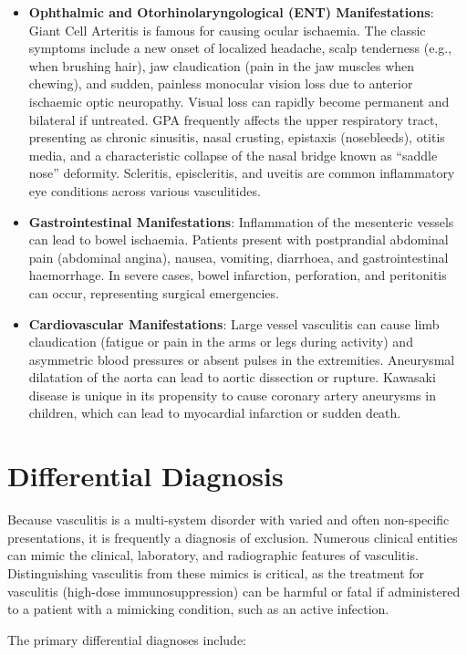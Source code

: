\begin{itemize}
\item \textbf{Ophthalmic and Otorhinolaryngological (ENT) Manifestations}: Giant Cell Arteritis is famous for causing ocular ischaemia. The classic symptoms include a new onset of localized headache, scalp tenderness (e.g., when brushing hair), jaw claudication (pain in the jaw muscles when chewing), and sudden, painless monocular vision loss due to anterior ischaemic optic neuropathy. Visual loss can rapidly become permanent and bilateral if untreated. GPA frequently affects the upper respiratory tract, presenting as chronic sinusitis, nasal crusting, epistaxis (nosebleeds), otitis media, and a characteristic collapse of the nasal bridge known as ``saddle nose'' deformity. Scleritis, episcleritis, and uveitis are common inflammatory eye conditions across various vasculitides.
\item \textbf{Gastrointestinal Manifestations}: Inflammation of the mesenteric vessels can lead to bowel ischaemia. Patients present with postprandial abdominal pain (abdominal angina), nausea, vomiting, diarrhoea, and gastrointestinal haemorrhage. In severe cases, bowel infarction, perforation, and peritonitis can occur, representing surgical emergencies.
\item \textbf{Cardiovascular Manifestations}: Large vessel vasculitis can cause limb claudication (fatigue or pain in the arms or legs during activity) and asymmetric blood pressures or absent pulses in the extremities. Aneurysmal dilatation of the aorta can lead to aortic dissection or rupture. Kawasaki disease is unique in its propensity to cause coronary artery aneurysms in children, which can lead to myocardial infarction or sudden death.
\end{itemize}

\section*{Differential Diagnosis}
Because vasculitis is a multi-system disorder with varied and often non-specific presentations, it is frequently a diagnosis of exclusion. Numerous clinical entities can mimic the clinical, laboratory, and radiographic features of vasculitis. Distinguishing vasculitis from these mimics is critical, as the treatment for vasculitis (high-dose immunosuppression) can be harmful or fatal if administered to a patient with a mimicking condition, such as an active infection.

The primary differential diagnoses include:

